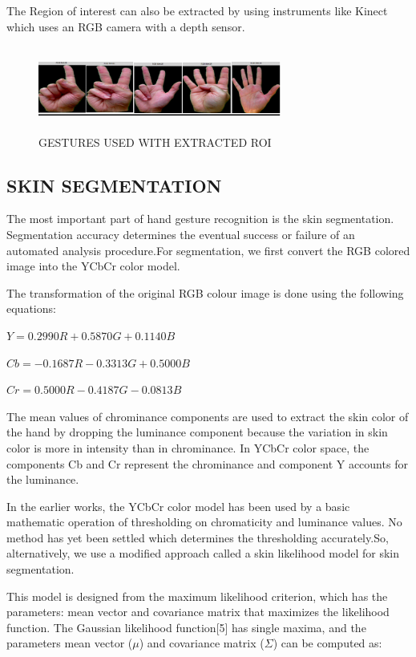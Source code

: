 \documentclass[conference]{IEEEtran}
\begin{document}
The Region of interest can also be extracted by using instruments like Kinect which uses an RGB camera with a depth sensor.

\begin{figure}[h!]
	\centering
	\includegraphics[width = 8cm, height = 2.8cm]{StandardDataset}
	\caption{GESTURES USED WITH EXTRACTED ROI}
\end{figure}

\subsection{SKIN SEGMENTATION}

The most important part of hand gesture recognition is the skin segmentation. Segmentation accuracy determines the eventual success or failure of an automated analysis procedure.For segmentation, we first convert the RGB colored image into the YCbCr color model.

The transformation of the original RGB colour image is done using
the following equations:

$Y = 0.2990R + 0.5870G + 0.1140B$

$Cb = -0.1687R - 0.3313G + 0.5000B$

$Cr = 0.5000R - 0.4187G - 0.0813B$

The mean values of chrominance components are used to extract the skin color of the hand by dropping the luminance component because the variation in skin color is more in intensity than in chrominance. In YCbCr color space, the components Cb and Cr represent the chrominance and component Y accounts for the luminance.

In the earlier works, the YCbCr color model has been used by a basic mathematic operation of thresholding on chromaticity and luminance values. No method has yet been settled which determines the thresholding accurately.So, alternatively, we use a modified approach called a skin likelihood model for skin segmentation.

This model is designed from the maximum likelihood criterion, which has the parameters: mean vector and covariance matrix that maximizes the likelihood function. The Gaussian likelihood function[5] has single maxima, and the parameters mean vector ($\mu$) and covariance matrix ($\Sigma$) can be computed as:
\end{document}
